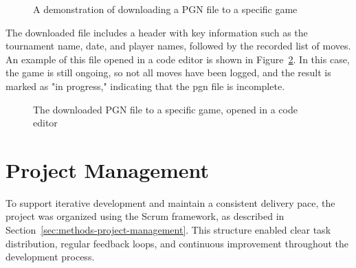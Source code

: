 \begin{figure}[h!] \centering {}\caption[Preview of downloading a PGN file]{A demonstration of downloading a PGN file to a specific game}\label{fig:download-pgn} \end{figure}

The downloaded file includes a header with key information such as the tournament name, date, and player names, followed by the recorded list of moves. An example of this file opened in a code editor is shown in Figure~\ref{fig:downloaded-pgn}. In this case, the game is still ongoing, so not all moves have been logged, and the result is marked as "in progress," indicating that the \gls{pgn} file is incomplete. \\

\begin{figure}[h!] \centering {}\caption[The downloaded PGN file]{The downloaded PGN file to a specific game, opened in a code editor}\label{fig:downloaded-pgn} \end{figure}

\section{Project Management}
\label{sec:results-project-management}

To support iterative development and maintain a consistent delivery pace, the project was organized using the Scrum framework, as described in Section~\ref{sec:methods-project-management}. This structure enabled clear task distribution, regular feedback loops, and continuous improvement throughout the development process. \\

